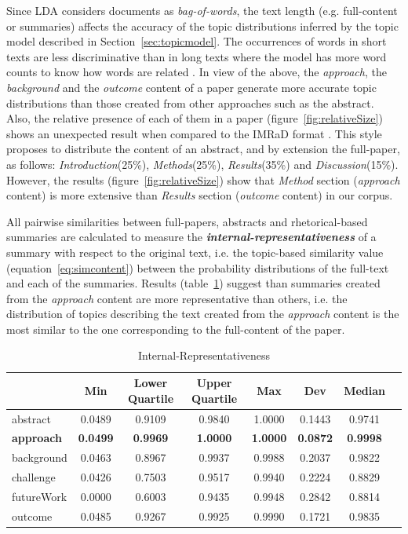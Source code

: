 Since LDA considers documents as \textit{bag-of-words}, the text length (e.g. full-content or summaries) affects the accuracy of the topic distributions inferred by the topic model described in Section~\ref{sec:topicmodel}. The occurrences of words in short texts are less discriminative than in long texts where the model has more word counts to know how words are related \citep{Hong2010}. In view of the above, the \textit{approach}, the \textit{background} and the \textit{outcome} content of a paper generate more accurate topic distributions than those created from other approaches such as the abstract. Also, the relative presence of each of them in a paper (figure~\ref{fig:relativeSize}) shows an unexpected result when compared to the IMRaD format \citep{Nair2014}. This style proposes to distribute the content of an abstract, and by extension the full-paper, as follows: \textit{Introduction}(25\%), \textit{Methods}(25\%), \textit{Results}(35\%) and \textit{Discussion}(15\%). However, the results (figure~\ref{fig:relativeSize}) show that \textit{Method} section (\textit{approach} content) is more extensive than \textit{Results} section (\textit{outcome} content) in our corpus.

All pairwise similarities between full-papers, abstracts and rhetorical-based summaries are calculated to measure the \textbf{\textit{internal-representativeness}} of a summary with respect to the original text, i.e. the topic-based similarity value (equation~\ref{eq:simcontent}) between the probability distributions of the full-text and each of the summaries. Results (table~\ref{tab:irepresentativeness}) suggest than summaries created from the \textit{approach} content are more representative than others, i.e. the distribution of topics describing the text created from the \textit{approach} content is the most similar to the one corresponding to the full-content of the paper.

\begin{table}[!htb]
    \centering
        \begin{tabular}{l*{6}{c}r}\hline
                        & Min & Lower Quartile & Upper Quartile & Max & Dev  & Median \\
          \hline
          abstract & 0.0489 & 0.9109 & 0.9840 & 1.0000 & 0.1443 & 0.9741 \\
          \textbf{approach} & \textbf{0.0499} & \textbf{0.9969} & \textbf{1.0000} & \textbf{1.0000} & \textbf{0.0872} & \textbf{0.9998} \\
          background & 0.0463 & 0.8967 & 0.9937 & 0.9988 & 0.2037 & 0.9822 \\
          challenge & 0.0426 & 0.7503 & 0.9517 & 0.9940 & 0.2224 & 0.8829 \\
          futureWork & 0.0000 & 0.6003 & 0.9435 & 0.9948 & 0.2842 & 0.8814 \\
          outcome & 0.0485 & 0.9267 & 0.9925 & 0.9990 & 0.1721 & 0.9835 \\
        \end{tabular}
    \caption{Internal-Representativeness}\label{tab:irepresentativeness}
\end{table}

